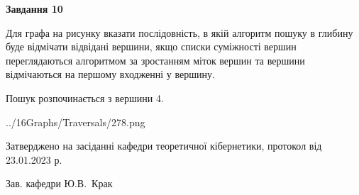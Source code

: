 \documentclass[12pt, ukrainian]{article}
\begin{document}
{\begin {large}
{\begin {center}\textbf{Завдання 10}\end {center}}\par
Для графа на рисунку вказати послідовність, в якій алгоритм пошуку в глибину буде відмічати відвідані вершини, якщо списки суміжності вершин переглядаються алгоритмом за зростанням міток вершин та вершини відмічаються на першому вход\-женні у вершину.\par
Пошук розпочинається з вершини 4.\par

\begin{center}
	{../16Graphs/Traversals/278.png}
\end{center}\par
\newpage


\end {large}
}
{\smallskip \begin {small} Затверджено на засіданні кафедри теоретичної кібернетики, протокол  від   23.01.2023 р.\par\smallskip\smallskip
{\parbox {6.5 cm}{Зав. кафедри \dotfill Ю.В.~Крак}} \end{small}}
\end{document}
